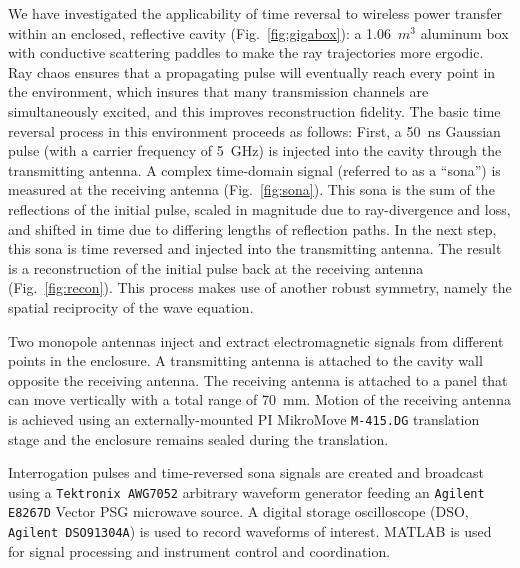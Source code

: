 We have investigated the applicability of time reversal to wireless power
transfer within an enclosed, reflective cavity (Fig.~\ref{fig:gigabox}): a
1.06~$m^3$ aluminum box with conductive scattering paddles to make the ray
trajectories more ergodic.
%
Ray chaos ensures that a propagating pulse will eventually reach every point in
the environment, which insures that many transmission channels are
simultaneously excited, and this improves reconstruction fidelity.
%
The basic time reversal process in this environment proceeds as follows: First,
a 50~ns Gaussian pulse (with a carrier frequency of 5~GHz) is injected into
the cavity through the transmitting antenna.
%
A complex time-domain signal (referred to as a ``sona'') is measured at the receiving
antenna (Fig.~\ref{fig:sona}).
%
This sona is the sum of the reflections of the initial pulse, scaled in
magnitude due to ray-divergence and loss, and shifted in time due to differing
lengths of reflection paths.
%
In the next step, this sona is time reversed and injected into the transmitting
antenna.
%
The result is a reconstruction of the initial pulse back at the receiving
antenna (Fig.~\ref{fig:recon}).
%
This process makes use of another robust symmetry, namely the spatial
reciprocity of the wave equation.



Two monopole antennas inject and extract electromagnetic signals from different
points in the enclosure. A transmitting antenna is attached to the cavity wall
opposite the receiving antenna.
%
The receiving antenna is attached to a panel that can move vertically with a
total range of 70~mm.
%
Motion of the receiving antenna is achieved using an externally-mounted PI
MikroMove \texttt{M-415.DG} translation stage and the enclosure remains sealed
during the translation.



Interrogation pulses and time-reversed sona signals are created and broadcast
using a \texttt{Tektronix AWG7052} arbitrary waveform generator feeding an
\texttt{Agilent E8267D} Vector PSG microwave source.
%
A digital storage oscilloscope (DSO, \texttt{Agilent DSO91304A}) is used to
record waveforms of interest. MATLAB is used for signal processing and
instrument control and coordination.
